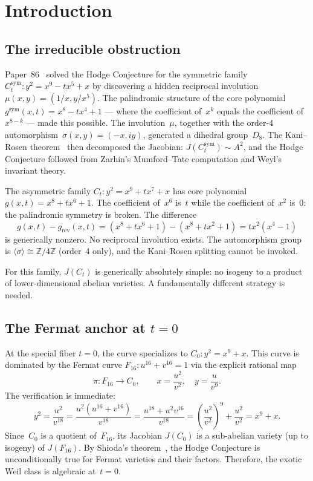 \documentclass[11pt]{article}
\theoremstyle{plain}
\theoremstyle{definition}
\theoremstyle{remark}
\newcommand{\Z}{\mathbb{Z}}
\begin{document}
\section{Introduction}
\label{sec:intro}

\subsection{The irreducible obstruction}

Paper~86~\cite{P86} solved the Hodge Conjecture for the symmetric
family $C_t^{\mathrm{sym}}\colon y^2 = x^9 - tx^5 + x$ by
discovering a hidden reciprocal involution $\mu(x,y) = (1/x, y/x^5)$.
The palindromic structure of the core polynomial
$g^{\mathrm{sym}}(x,t) = x^8 - tx^4 + 1$ --- where the coefficient
of~$x^k$ equals the coefficient of~$x^{8-k}$ --- made this possible.
The involution~$\mu$, together with the order-4
automorphism~$\sigma(x,y) = (-x, iy)$, generated a dihedral
group~$D_8$.  The Kani--Rosen theorem~\cite{KR89} then decomposed
the Jacobian: $J(C_t^{\mathrm{sym}}) \sim A^2$, and the Hodge
Conjecture followed from Zarhin's Mumford--Tate computation and
Weyl's invariant theory.

The asymmetric family $C_t\colon y^2 = x^9 + tx^7 + x$ has core
polynomial $g(x,t) = x^8 + tx^6 + 1$.  The coefficient of~$x^6$
is~$t$ while the coefficient of~$x^2$ is~$0$: the palindromic
symmetry is broken.  The difference
\[
  g(x,t) - g_{\mathrm{rev}}(x,t)
  = (x^8 + tx^6 + 1) - (x^8 + tx^2 + 1) = tx^2(x^4 - 1)
\]
is generically nonzero.  No reciprocal involution exists.
The automorphism group is $\langle\sigma\rangle \cong \Z/4\Z$
(order~4 only), and the Kani--Rosen splitting cannot be invoked.

For this family, $J(C_t)$ is generically absolutely simple:
no isogeny to a product of lower-dimensional abelian varieties.
A fundamentally different strategy is needed.

\subsection{The Fermat anchor at $t = 0$}

At the special fiber $t = 0$, the curve specializes to
$C_0\colon y^2 = x^9 + x$.  This curve is dominated by the
Fermat curve $F_{16}\colon u^{16} + v^{16} = 1$ via the explicit
rational map
\begin{equation}\label{eq:pi}
  \pi\colon F_{16} \to C_0, \qquad
  x = \frac{u^2}{v^2}, \quad y = \frac{u}{v^9}.
\end{equation}
The verification is immediate:
\[
  y^2 = \frac{u^2}{v^{18}}
  = \frac{u^2(u^{16} + v^{16})}{v^{18}}
  = \frac{u^{18} + u^2 v^{16}}{v^{18}}
  = \left(\frac{u^2}{v^2}\right)^{\!9} + \frac{u^2}{v^2}
  = x^9 + x.
\]
Since~$C_0$ is a quotient of~$F_{16}$, its Jacobian $J(C_0)$
is a sub-abelian variety (up to isogeny) of $J(F_{16})$.
By Shioda's theorem~\cite{Shioda82}, the Hodge Conjecture is
unconditionally true for Fermat varieties and their factors.
Therefore, the exotic Weil class is algebraic at~$t = 0$.
\end{document}
